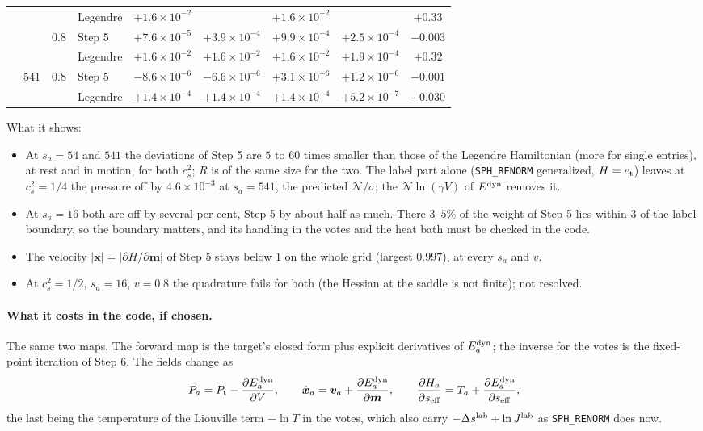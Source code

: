 \documentclass[11pt,aps,preprint,nofootinbib,superscriptaddress,tightenlines]{revtex4-2}
\def\st{\begin{equation}}
\def\stp{\end{equation}}
\let\oldparagraph\paragraph
\renewcommand{\paragraph}{\par\bigskip\oldparagraph}
\begin{document}
\begin{center}
\begin{tabular}{cccl ccccc}
 & & & Legendre & $+1.6\times10^{-2}$ & & $+1.6\times10^{-2}$ & & $+0.33$ \\
 & & $0.8$ & Step 5 & $+7.6\times10^{-5}$ & $+3.9\times10^{-4}$ & $+9.9\times10^{-4}$ & $+2.5\times10^{-4}$ & $-0.003$ \\
 & & & Legendre & $+1.6\times10^{-2}$ & $+1.6\times10^{-2}$ & $+1.6\times10^{-2}$ & $+1.9\times10^{-4}$ & $+0.32$ \\
 & $541$ & $0.8$ & Step 5 & $-8.6\times10^{-6}$ & $-6.6\times10^{-6}$ & $+3.1\times10^{-6}$ & $+1.2\times10^{-6}$ & $-0.001$ \\
 & & & Legendre & $+1.4\times10^{-4}$ & $+1.4\times10^{-4}$ & $+1.4\times10^{-4}$ & $+5.2\times10^{-7}$ & $+0.030$ \\
\bottomrule
\end{tabular}
\end{center}
What it shows:
\begin{itemize}
\item At $s_a=54$ and $541$ the deviations of Step 5 are $5$ to $60$ times smaller than those of the Legendre Hamiltonian (more for single entries), at rest and in motion, for both $c_s^2$; $R$ is of the same
  size for the two.  The label part alone (\texttt{SPH\_RENORM} generalized, $H=e_{\rm t}$) leaves at $c_s^2=1/4$ the pressure off by $4.6\times10^{-3}$ at $s_a=541$, the
  predicted $\mathcal N/\sigma$; the $\mathcal N\ln(\gamma V)$ of $E^{\rm dyn}$ removes it.
\item At $s_a=16$ both are off by several per cent, Step 5 by about half as much.  There $3$--$5\%$ of the weight of Step 5 lies within $3$ of the label boundary, so
  the boundary matters, and its handling in the votes and the heat bath must be checked in the code.
\item The velocity $|\dot{\bm x}|=|\partial H/\partial\bm m|$ of Step 5 stays below $1$ on the whole grid (largest $0.997$), at every $s_a$ and $v$.
\item At $c_s^2=1/2$, $s_a=16$, $v=0.8$ the quadrature fails for both (the Hessian at the saddle is not finite); not resolved.
\end{itemize}

\paragraph{What it costs in the code, if chosen.}  The same two maps.  The forward map is the target's closed form plus explicit derivatives of
$E^{\rm dyn}_a$; the inverse for the votes is the fixed-point iteration of Step 6.  The fields change as
\st
P_a=P_{\rm t}-\frac{\partial E^{\rm dyn}_a}{\partial V},\qquad
\dot{\bm x}_a=\bm v_a+\frac{\partial E^{\rm dyn}_a}{\partial\bm m},\qquad
\frac{\partial H_a}{\partial s_{\rm eff}}=T_a+\frac{\partial E^{\rm dyn}_a}{\partial s_{\rm eff}} ,
\stp
the last being the temperature of the Liouville term $-\ln T$ in the votes, which also carry $-\Delta s^{\rm lab}+\ln J^{\rm lab}$ as \texttt{SPH\_RENORM} does now.
\end{document}

